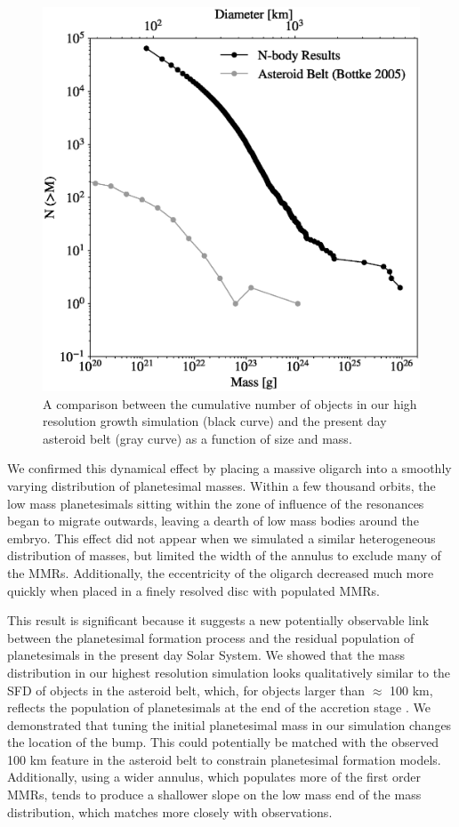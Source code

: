 \begin{figure}
    \includegraphics[width=\columnwidth]{figures/plSS/cum_asteroid_comparison.eps}
    \caption{A comparison between the cumulative number of objects in our high resolution growth simulation (black curve) and 
    the present day asteroid belt \cite{bottke05} (gray curve) as a function of size and mass.}
    \label{fig:mass_dist_ast_compare}
\end{figure}

We confirmed this dynamical effect by placing a massive oligarch into a smoothly varying distribution of planetesimal masses. 
Within a few thousand orbits, the low mass planetesimals sitting within the zone of influence of the resonances began to migrate 
outwards, leaving a dearth of low mass bodies around the embryo. This effect did not appear when we simulated a similar 
heterogeneous distribution of masses, but limited the width of the annulus to exclude many of the MMRs. Additionally, the 
eccentricity of the oligarch decreased much more quickly when placed in a finely resolved disc with populated MMRs.

This result is significant because it suggests a new potentially observable link between the planetesimal formation process and 
the residual population of planetesimals in the present day Solar System. We showed that the mass distribution in our highest 
resolution simulation looks qualitatively similar to the SFD of objects in the asteroid belt, which, for objects larger than $\approx$ 
100 km, reflects the population of planetesimals at the end of the accretion stage \cite{morbidelli09}. We demonstrated that 
tuning the initial planetesimal mass in our simulation changes the location of the bump. This could potentially be matched with 
the observed 100 km feature in the asteroid belt to constrain planetesimal formation models. Additionally, using a wider annulus, 
which populates more of the first order MMRs, tends to produce a shallower slope on the low mass end of the mass distribution, 
which matches more closely with observations.

